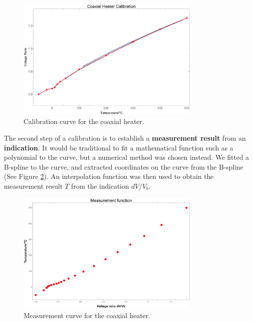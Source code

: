 \begin{figure}
	\centering
	\includegraphics[width=0.8\textwidth]{Figures/2019_07_12_B-spline_fit_CPlot.pdf}
	\decoRule
	\caption[Calibration curve of the coaxial heater]{Calibration curve for the coaxial heater.}	
	\label{fig:CalibrationCurve}
\end{figure}

The second step of a calibration is to establish a \textbf{measurement result}
from an \textbf{indication}. It would be traditional to fit a mathematical
function such as a polynomial to the curve, but a numerical method was chosen
instead. We fitted a B-spline to the curve, and extracted coordinates on the
curve from the B-spline (See Figure \ref{fig:MeasurementCurve}). An
interpolation function was then used to obtain the measurement result \(T\) from
the indication \(dV/V_b\).

\begin{figure}
	\centering
	\includegraphics[width=0.8\textwidth]{Figures/2019_07_12_B-spline_fit_PPlot.pdf}
	\decoRule
	\caption[Measurement curve of the coaxial heater]{Measurement curve for the coaxial heater.}	
	\label{fig:MeasurementCurve}
\end{figure}

